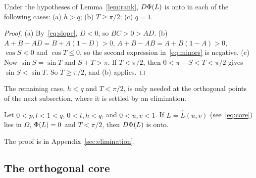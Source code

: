 \begin{corollary}\label{cor:rank}
Under the hypotheses of Lemma~\ref{lem:rank}, $D\Phi(L)$ is onto in each of
the following cases:
\textup{(a)} $h>q$;
\textup{(b)} $T\ge\pi/2$;
\textup{(c)} $q=1$.
\end{corollary}

\begin{proof}
(a) By~\eqref{eq:slope}, $D<0$, so $BC>0>AD$.
(b) $A+B-AD=B+A(1-D)>0$, $A+B-AB=A+B(1-A)>0$, $\cos S<0$ and $\cos T\le0$, so
the second expression in~\eqref{eq:minors} is negative.
(c) Now $\sin S=\sin T$ and $S+T>\pi$. If $T<\pi/2$, then $0<\pi-S<T<\pi/2$
gives $\sin S<\sin T$. So $T\ge\pi/2$, and (b) applies.
\end{proof}

The remaining case, $h<q$ and $T<\pi/2$, is only needed at the orthogonal
points of the next subsection, where it is settled by an elimination.

\begin{proposition}\label{prop:acute}
Let $0<p,l<1<q$, $0<t,h<q$, and $0<u,v<1$. If $L=\hat L(u,v)$
\textup{(}see~\eqref{eq:core}\textup{)} lies in $\Omega$, $\Phi(L)=0$ and
$T<\pi/2$, then $D\Phi(L)$ is onto.
\end{proposition}

The proof is in Appendix~\ref{sec:elimination}.

\subsection{The orthogonal core}

